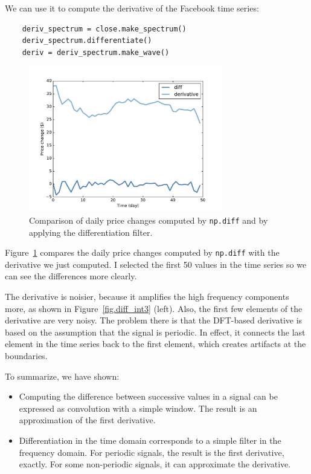 \documentclass[12pt]{book}
\begin{document}
We can use it to compute the derivative of the Facebook time series:

\begin{verbatim}
    deriv_spectrum = close.make_spectrum()
    deriv_spectrum.differentiate()
    deriv = deriv_spectrum.make_wave()
\end{verbatim}

\begin{figure}
\centerline{\includegraphics[height=2.5in]{figs/diff_int4.pdf}}
\caption{Comparison of daily price changes computed by
{\tt np.diff} and by applying the differentiation filter.}
\label{fig.diff_int4}
\end{figure}

Figure~\ref{fig.diff_int4} compares the daily price changes computed by
{\tt np.diff} with the derivative we just computed.
I selected the first 50 values in the time series so we can see the
differences more clearly.

The derivative is noisier, because it amplifies the high frequency
components more, as shown in Figure~\ref{fig.diff_int3} (left).  Also, the
first few elements of the derivative are very noisy.  The problem
there is that the DFT-based derivative is based on the assumption that
the signal is periodic.  In effect, it connects the last element in
the time series back to the first element, which creates artifacts at
the boundaries.

To summarize, we have shown:

\begin{itemize} 

\item Computing the difference between successive values in a signal
  can be expressed as convolution with a simple window.  The result is
  an approximation of the first derivative.

\item Differentiation in the time domain corresponds to a simple
  filter in the frequency domain.  For periodic signals, the result is
  the first derivative, exactly.  For some non-periodic signals, it
  can approximate the derivative.

\end{itemize}
\end{document}
